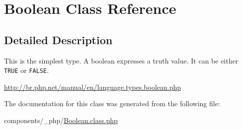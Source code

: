 \hypertarget{class_boolean}{
\section{Boolean Class Reference}
\label{class_boolean}
}


\subsection{Detailed Description}
This is the simplest type. A boolean expresses a truth value. It can be either {\tt TRUE} or {\tt FALSE}.

\hyperlink{}{http://br.php.net/manual/en/language.types.boolean.php}

The documentation for this class was generated from the following file:\begin{CompactItemize}
\item 
components/\_\-php/\hyperlink{_boolean_8class_8php}{Boolean.class.php}\end{CompactItemize}
